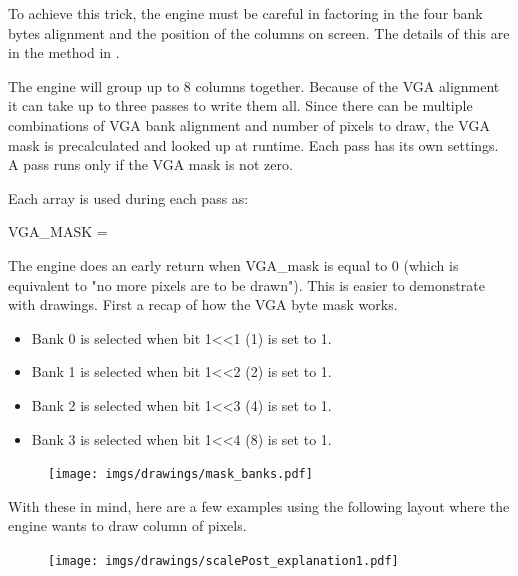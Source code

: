 To achieve this trick, the engine must be careful in factoring in the four bank bytes alignment and the position of the columns on screen. The details of this are in the method  in .\\
\par 
\begin{minipage}{\textwidth}

\end{minipage}
The engine will group up to 8 columns together. Because of the VGA alignment it can take up to three passes to write them all. Since there can be multiple combinations of VGA bank alignment and number of pixels to draw, the VGA mask is precalculated and looked up at runtime. Each pass has its own settings. A pass runs only if the VGA mask is not zero.\\

 \par
 \begin{minipage}{\textwidth}

\end{minipage}
Each  array is used during each pass  as:\\
\par
 VGA\_MASK = \\
 \par
 The engine does an early return when VGA\_mask is equal to 0 (which is equivalent to "no more pixels are to be drawn"). This is easier to demonstrate with drawings. First a recap of how the VGA byte mask works.
\begin{itemize}
\item Bank 0 is selected when bit 1<<1 (1) is set to 1.
\item Bank 1 is selected when bit 1<<2 (2) is set to 1.
\item Bank 2 is selected when bit 1<<3 (4) is set to 1.
\item Bank 3 is selected when bit 1<<4 (8) is set to 1.
\end{itemize}
\par


\begin{figure}[H]
\centering
 \texttt{[image: imgs/drawings/mask\_banks.pdf]}
 \end{figure}


With these in mind, here are a few examples using the following layout where the engine wants to draw column of pixels.
\begin{figure}[H]
\centering
 \texttt{[image: imgs/drawings/scalePost\_explanation1.pdf]}
 \end{figure}


